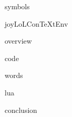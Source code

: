 
\usemodule[t-diSimp]

\startDiSimpComponent symbols

\diSimpEnvironment joyLoLConTeXtEnv

\startJoyLoLCoAlg[title=Symbols][symbols]

\diSimpComponent overview

\diSimpComponent code

\diSimpComponent words

\diSimpComponent lua

\diSimpComponent conclusion

\stopJoyLoLCoAlg

\stopDiSimpComponent
